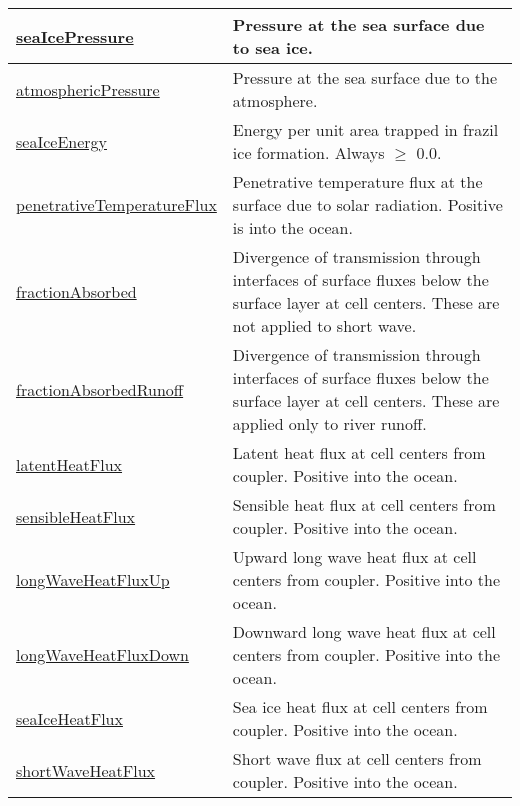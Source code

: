 {\begin{center}
\begin{longtable}{| p{2.0in} | p{4.0in} |}
    \hline
    \hyperref[subsec:var_sec_forcing_seaIcePressure]{seaIcePressure} & Pressure at the sea surface due to sea ice. \\
    \hline
    \hyperref[subsec:var_sec_forcing_atmosphericPressure]{atmosphericPressure} & Pressure at the sea surface due to the atmosphere. \\
    \hline
    \hyperref[subsec:var_sec_forcing_seaIceEnergy]{seaIceEnergy} &  Energy per unit area trapped in frazil ice formation. Always  $\ge$  0.0. \\
    \hline
    \hyperref[subsec:var_sec_forcing_penetrativeTemperatureFlux]{penetrativeTemperatureFlux} & Penetrative temperature flux at the surface due to solar radiation. Positive is into the ocean. \\
    \hline
    \hyperref[subsec:var_sec_forcing_fractionAbsorbed]{fractionAbsorbed} & Divergence of transmission through interfaces of surface fluxes below the surface layer at cell centers. These are not applied to short wave. \\
    \hline
    \hyperref[subsec:var_sec_forcing_fractionAbsorbedRunoff]{fractionAbsorbedRunoff} & Divergence of transmission through interfaces of surface fluxes below the surface layer at cell centers. These are applied only to river runoff. \\
    \hline
    \hyperref[subsec:var_sec_forcing_latentHeatFlux]{latentHeatFlux} & Latent heat flux at cell centers from coupler. Positive into the ocean. \\
    \hline
    \hyperref[subsec:var_sec_forcing_sensibleHeatFlux]{sensibleHeatFlux} & Sensible heat flux at cell centers from coupler. Positive into the ocean. \\
    \hline
    \hyperref[subsec:var_sec_forcing_longWaveHeatFluxUp]{longWaveHeatFluxUp} & Upward long wave heat flux at cell centers from coupler. Positive into the ocean. \\
    \hline
    \hyperref[subsec:var_sec_forcing_longWaveHeatFluxDown]{longWaveHeatFluxDown} & Downward long wave heat flux at cell centers from coupler. Positive into the ocean. \\
    \hline
    \hyperref[subsec:var_sec_forcing_seaIceHeatFlux]{seaIceHeatFlux} & Sea ice heat flux at cell centers from coupler. Positive into the ocean. \\
    \hline
    \hyperref[subsec:var_sec_forcing_shortWaveHeatFlux]{shortWaveHeatFlux} & Short wave flux at cell centers from coupler. Positive into the ocean. \\
    \hline

\end{longtable}
\end{center}}
